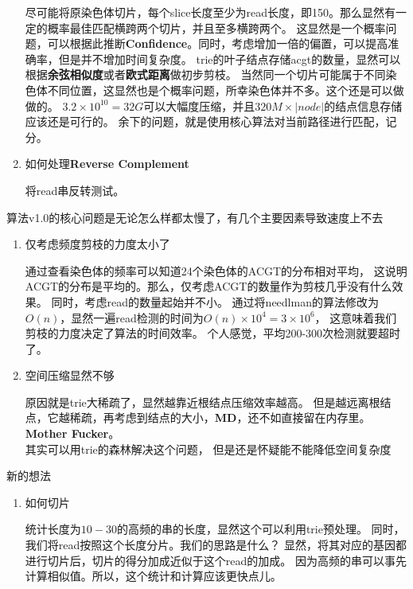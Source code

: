 \documentclass[hyperref,UTF8]{ctexart}
\theoremstyle{definition}
\theoremstyle{remark}
\numberwithin{equation}{subsection}
\newcommand{\Emph}{\textbf}
\begin{document}
\begin{enumerate}
		尽可能将原染色体切片，每个slice长度至少为read长度，即150。那么显然有一定的概率最佳匹配横跨两个切片，并且至多横跨两个。
		这显然是一个概率问题，可以根据此推断\Emph{Confidence}。同时，考虑增加一倍的偏置，可以提高准确率，但是并不增加时间复杂度。
		trie的叶子结点存储acgt的数量，显然可以根据\Emph{余弦相似度}或者\Emph{欧式距离}做初步剪枝。
		当然同一个切片可能属于不同染色体不同位置，这显然也是个概率问题，所幸染色体并不多。这个还是可以做做的。
		$3.2 \times 10^10 = 32G$可以大幅度压缩，并且$320M \times |node|$的结点信息存储应该还是可行的。
		余下的问题，就是使用核心算法对当前路径进行匹配，记分。

		\item 如何处理\Emph{Reverse Complement}
		
		将read串反转测试。
	
	\end{enumerate}
	
	算法v1.0的核心问题是无论怎么样都太慢了，有几个主要因素导致速度上不去
	\begin{enumerate}
	
		\item 仅考虑频度剪枝的力度太小了
		
		通过查看染色体的频率可以知道24个染色体的ACGT的分布相对平均，
		这说明ACGT的分布是平均的。那么，仅考虑ACGT的数量作为剪枝几乎没有什么效果。
		同时，考虑read的数量起始并不小。
		通过将needlman的算法修改为$O(n)$，显然一遍read检测的时间为$O(n) \times 10^4 = 3\times10^6$，
		这意味着我们剪枝的力度决定了算法的时间效率。
		个人感觉，平均200-300次检测就要超时了。
		
		\item 空间压缩显然不够
		
		原因就是trie大稀疏了，显然越靠近根结点压缩效率越高。
		但是越远离根结点，它越稀疏，再考虑到结点的大小，\Emph{MD}，还不如直接留在内存里。\\
		\Emph{Mother Fucker}。\\
		其实可以用trie的森林解决这个问题，
		但是还是怀疑能不能降低空间复杂度
		
	\end{enumerate}
	
	新的想法
	\begin{enumerate}

        \item 如何切片

    	统计长度为$10-30$的高频的串的长度，显然这个可以利用trie预处理。
    	同时，我们将read按照这个长度分片。我们的思路是什么？
    	显然，将其对应的基因都进行切片后，切片的得分加成近似于这个read的加成。
    	因为高频的串可以事先计算相似值。所以，这个统计和计算应该更快点儿。


	\end{enumerate}
	
\end{document}
